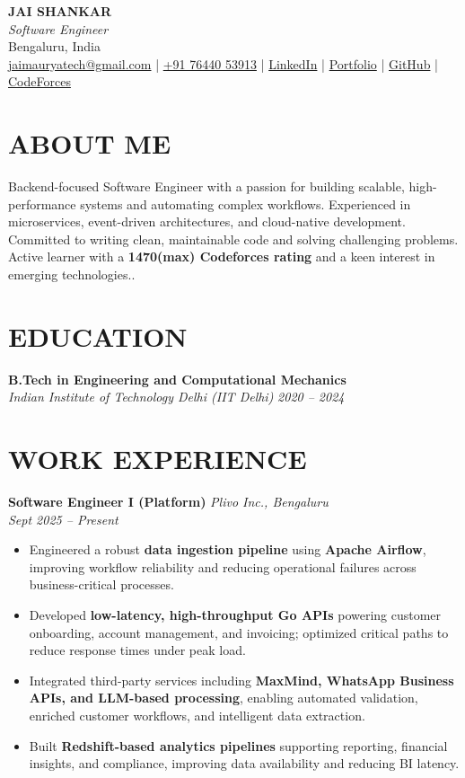 \documentclass[a4paper,10pt]{article}
\begin{document}
\begin{center}
    {\LARGE \textbf{JAI SHANKAR}}\\[4pt]
    \textit{Software Engineer} \\
    Bengaluru, India \\
    \href{mailto:jaimauryatech@gmail.com}{jaimauryatech@gmail.com} \quad | \quad
    \href{tel:+917644053913}{+91 76440 53913} \quad | \quad
    \href{https://www.linkedin.com/in/jai-shankar-b7b388234}{LinkedIn} \quad |\quad
    \href{https://profile.theweekendworld.com/}{Portfolio} \quad | \quad
    \href{https://github.com/jai0651}{GitHub} \quad | \quad
     \href{https://codeforces.com/profile/ryukk19}{CodeForces}
\end{center}



\vspace{0.5em}
\section*{ABOUT ME}
Backend-focused Software Engineer with a passion for building scalable, high-performance systems and automating complex workflows. Experienced in microservices, event-driven architectures, and cloud-native development. Committed to writing clean, maintainable code and solving challenging problems. Active learner with a \textbf{1470(max) Codeforces rating} and a keen interest in emerging technologies..

\section*{EDUCATION}
\textbf{B.Tech in Engineering and Computational Mechanics} \\
\textit{Indian Institute of Technology Delhi (IIT Delhi)} \hfill \textit{2020 – 2024}

\section*{WORK EXPERIENCE}

\textbf{Software Engineer I (Platform)} \hfill \textit{Plivo Inc., Bengaluru} \\
\textit{Sept 2025 – Present}
\begin{itemize}
  \item Engineered a robust \textbf{data ingestion pipeline} using \textbf{Apache Airflow}, improving workflow reliability and reducing operational failures across business-critical processes.
  \item Developed \textbf{low-latency, high-throughput Go APIs} powering customer onboarding, account management, and invoicing; optimized critical paths to reduce response times under peak load.
  \item Integrated third-party services including \textbf{MaxMind, WhatsApp Business APIs, and LLM-based processing}, enabling automated validation, enriched customer workflows, and intelligent data extraction.
  \item Built \textbf{Redshift-based analytics pipelines} supporting reporting, financial insights, and compliance, improving data availability and reducing BI latency.
\end{itemize}
\end{document}
